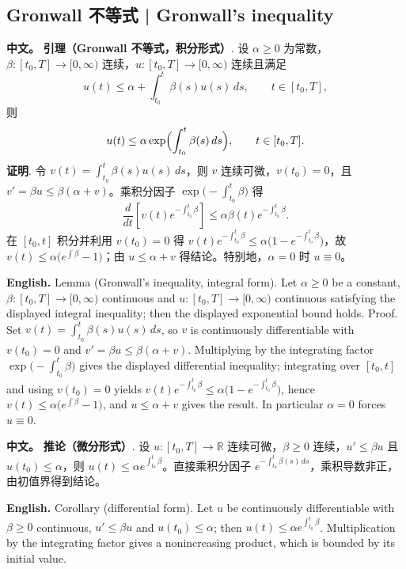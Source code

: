 \documentclass[UTF8,11pt,a4paper]{ctexart}
\newcommand{\APS}[2]{\par\noindent\textbf{中文。} #1\par\noindent\textbf{English.} #2\par}
\begin{document}
\subsection{Gronwall 不等式 | Gronwall's inequality}
\APS{\textbf{引理（Gronwall 不等式，积分形式）}. 设 $\alpha\ge0$ 为常数，$\beta\colon[t_0,T]\to[0,\infty)$ 连续，$u\colon[t_0,T]\to[0,\infty)$ 连续且满足
\[
u(t)\le\alpha+\int_{t_0}^{t}\beta(s)u(s)\,ds,\qquad t\in[t_0,T],
\]
则
\[
u(t)\le\alpha\exp\Bigl(\int_{t_0}^{t}\beta(s)\,ds\Bigr),\qquad t\in[t_0,T].
\]
\textbf{证明}. 令 $v(t)=\int_{t_0}^{t}\beta(s)u(s)\,ds$，则 $v$ 连续可微，$v(t_0)=0$，且 $v'=\beta u\le\beta(\alpha+v)$。乘积分因子 $\exp\bigl(-\int_{t_0}^{t}\beta\bigr)$ 得
\[
\frac{d}{dt}\left[v(t)e^{-\int_{t_0}^{t}\beta}\right]\le\alpha\beta(t)e^{-\int_{t_0}^{t}\beta}.
\]
在 $[t_0,t]$ 积分并利用 $v(t_0)=0$ 得 $v(t)e^{-\int_{t_0}^t\beta}\le\alpha\bigl(1-e^{-\int_{t_0}^t\beta}\bigr)$，故 $v(t)\le\alpha\bigl(e^{\int\beta}-1\bigr)$；由 $u\le\alpha+v$ 得结论。特别地，$\alpha=0$ 时 $u\equiv0$。}{Lemma (Gronwall's inequality, integral form). Let $\alpha\ge0$ be a constant, $\beta\colon[t_0,T]\to[0,\infty)$ continuous and $u\colon[t_0,T]\to[0,\infty)$ continuous satisfying the displayed integral inequality; then the displayed exponential bound holds. Proof. Set $v(t)=\int_{t_0}^{t}\beta(s)u(s)\,ds$, so $v$ is continuously differentiable with $v(t_0)=0$ and $v'=\beta u\le\beta(\alpha+v)$. Multiplying by the integrating factor $\exp\bigl(-\int_{t_0}^{t}\beta\bigr)$ gives the displayed differential inequality; integrating over $[t_0,t]$ and using $v(t_0)=0$ yields $v(t)e^{-\int_{t_0}^t\beta}\le\alpha\bigl(1-e^{-\int_{t_0}^t\beta}\bigr)$, hence $v(t)\le\alpha\bigl(e^{\int\beta}-1\bigr)$, and $u\le\alpha+v$ gives the result. In particular $\alpha=0$ forces $u\equiv0$.}
\APS{\textbf{推论（微分形式）}. 设 $u\colon[t_0,T]\to\mathbb R$ 连续可微，$\beta\ge0$ 连续，$u'\le\beta u$ 且 $u(t_0)\le\alpha$，则 $u(t)\le\alpha e^{\int_{t_0}^t\beta}$。直接乘积分因子 $e^{-\int_{t_0}^t\beta(s)\,ds}$，乘积导数非正，由初值界得到结论。}{Corollary (differential form). Let $u$ be continuously differentiable with $\beta\ge0$ continuous, $u'\le\beta u$ and $u(t_0)\le\alpha$; then $u(t)\le\alpha e^{\int_{t_0}^t\beta}$. Multiplication by the integrating factor gives a nonincreasing product, which is bounded by its initial value.}
\end{document}

